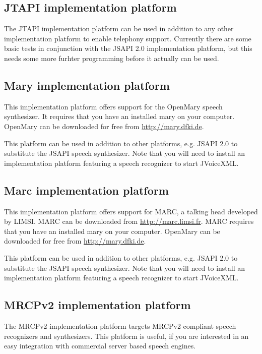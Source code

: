 \documentclass[11pt,a4paper]{book}
\begin{document}
\subsection{JTAPI implementation platform}

The JTAPI implementation platform can be used in addition to any other
implementation platform to enable telephony support. Currently there are some
basic tests in conjunction with the JSAPI 2.0 implementation platform, but this
needs some more furhter programming before it actually can be used.

\subsection{Mary implementation platform}

This implementation platform offers support for the OpenMary speech synthesizer. 
It requires that you have an installed mary on your computer. OpenMary can be
downloaded for free from \url{http://mary.dfki.de}.

This platform can be used in addition to other platforms, e.g. JSAPI 2.0 to
substitute the JSAPI speech synthesizer. Note that you will need to install an
implementation platform featuring a speech recognizer to start JVoiceXML.


\subsection{Marc implementation platform}

This implementation platform offers support for MARC, a talking
head developed by LIMSI. MARC can be downloaded from 
\url{http://marc.limsi.fr}. MARC requires that you have an installed mary on
your computer. OpenMary can be downloaded for free from \url{http://mary.dfki.de}.

This platform can be used in addition to other platforms, e.g. JSAPI 2.0 to
substitute the JSAPI speech synthesizer. Note that you will need to install an
implementation platform featuring a speech recognizer to start JVoiceXML.

\subsection{MRCPv2 implementation platform}

The MRCPv2 implementation platform targets MRCPv2 compliant speech recognizers
and synthesizers. This platform is useful, if you are interested in an easy
integration with commercial server based speech engines.
\end{document}
